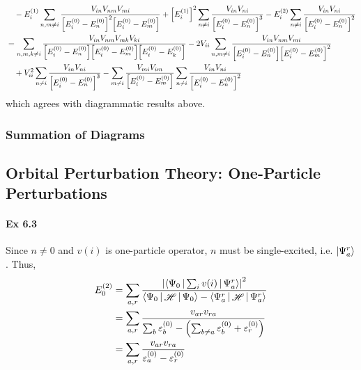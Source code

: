 \documentclass[a4paper]{article}
\DeclareMathOperator{\sH}{\mathscr{H}}
\newcommand{\ex}[1]{\paragraph{Ex #1}}
\numberwithin{equation}{subsection}
\begin{document}
\begin{align}
&{}\quad- E_i^{(1)} \sum_{n,m\neq i} \dfrac{V_{in}V_{nm}V_{mi} }{\qty[E_i^{(0)} - E_n^{(0)}]^2\qty[E_i^{(0)} - E_m^{(0)}]} 
 +  \qty[E_i^{(1)}]^2 \sum_{n\neq i} \dfrac{V_{in}V_{ni}}{\qty[E_i^{(0)} - E_n^{(0)}]^3} 
-  E_i^{(2)} \sum_{n\neq i} \dfrac{V_{in}V_{ni}}{\qty[E_i^{(0)} - E_n^{(0)}]^2} \notag\\
&= \sum_{n,m,k\neq i} \dfrac{V_{in} V_{nm}V_{mk}V_{ki}}{\qty[E_i^{(0)} - E_n^{(0)}]\qty[E_i^{(0)} - E_m^{(0)}]\qty[E_i^{(0)} - E_k^{(0)}]} 
- 2V_{ii}\sum_{n,m\neq i} \dfrac{V_{in} V_{nm} V_{mi}}{\qty[E_i^{(0)} - E_n^{(0)}]\qty[E_i^{(0)} - E_m^{(0)}]^2}  \notag\\
&{}\quad %
+  V_{ii}^2 \sum_{n\neq i} \dfrac{V_{in}V_{ni}}{\qty[E_i^{(0)} - E_n^{(0)}]^3} 
-  \sum_{m\neq i} \dfrac{V_{mi}V_{im}}{\qty[E_i^{(0)} - E_m^{(0)}]} \sum_{n\neq i} \dfrac{V_{in}V_{ni}}{\qty[E_i^{(0)} - E_n^{(0)}]^2} 
\end{align}
which agrees with diagrammatic results above.

\subsubsection{Summation of Diagrams}

\subsection{Orbital Perturbation Theory: One-Particle Perturbations}
\ex{6.3}
Since $ n\neq 0 $ and $ v(i) $ is one-particle operator, $ n $ must be single-excited, i.e. $ \ket{\Psi_a^r} $. Thus,
\begin{align}
E_0^{(2)} &= \sum_{a,r} \dfrac{\abs{\Braket{\Psi_0 | \sum_i v(i) | \Psi_a^r}}^2}{\Braket{\Psi_0 | \sH | \Psi_0} - \Braket{\Psi_a^r| \sH | \Psi_a^r}} \notag\\
&= \sum_{a,r} \dfrac{v_{ar} v_{ra}}{\sum_b \varepsilon_b^{(0)} - \qty(\sum_{b\neq a}\varepsilon_b^{(0)} + \varepsilon_r^{(0)})} \notag\\
&= \sum_{a,r} \dfrac{v_{ar} v_{ra}}{\varepsilon_a^{(0)} - \varepsilon_r^{(0)}}
\end{align}
\end{document}
